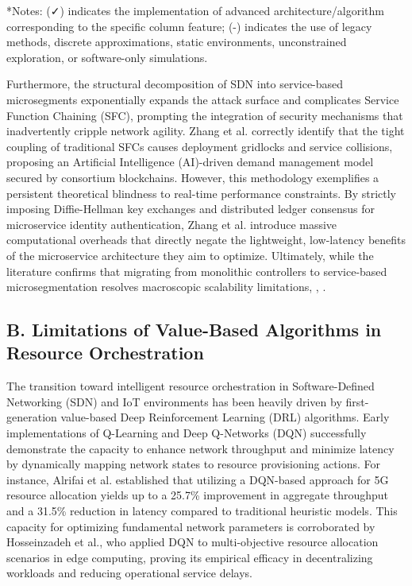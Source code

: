 *Notes: (✓) indicates the implementation of advanced architecture/algorithm corresponding to the specific column feature; (-) indicates the use of legacy methods, discrete approximations, static environments, unconstrained exploration, or software-only simulations.

Furthermore, the structural decomposition of SDN into service-based microsegments exponentially expands the attack surface and complicates Service Function Chaining (SFC), prompting the integration of security mechanisms that inadvertently cripple network agility. Zhang et al. correctly identify that the tight coupling of traditional SFCs causes deployment gridlocks and service collisions, proposing an Artificial Intelligence (AI)-driven demand management model secured by consortium blockchains\cite{b21}. However, this methodology exemplifies a persistent theoretical blindness to real-time performance constraints. By strictly imposing Diffie-Hellman key exchanges and distributed ledger consensus for microservice identity authentication, Zhang et al. introduce massive computational overheads that directly negate the lightweight, low-latency benefits of the microservice architecture they aim to optimize\cite{b38}. Ultimately, while the literature confirms that migrating from monolithic controllers to service-based microsegmentation resolves macroscopic scalability limitations\cite{b8}, \cite{b12}, \cite{b19}.

\subsection{B. Limitations of Value-Based Algorithms in Resource Orchestration}\label{b.-limitations-of-value-based-algorithms-in-resource-orchestration}

The transition toward intelligent resource orchestration in Software-Defined Networking (SDN) and IoT environments has been heavily driven by first-generation value-based Deep Reinforcement Learning (DRL) algorithms. Early implementations of Q-Learning and Deep Q-Networks (DQN) successfully demonstrate the capacity to enhance network throughput and minimize latency by dynamically mapping network states to resource provisioning actions. For instance, Alrifai et al. established that utilizing a DQN-based approach for 5G resource allocation yields up to a 25.7\% improvement in aggregate throughput and a 31.5\% reduction in latency compared to traditional heuristic models\cite{b14}. This capacity for optimizing fundamental network parameters is corroborated by Hosseinzadeh et al., who applied DQN to multi-objective resource allocation scenarios in edge computing, proving its empirical efficacy in decentralizing workloads and reducing operational service delays\cite{b15}.

